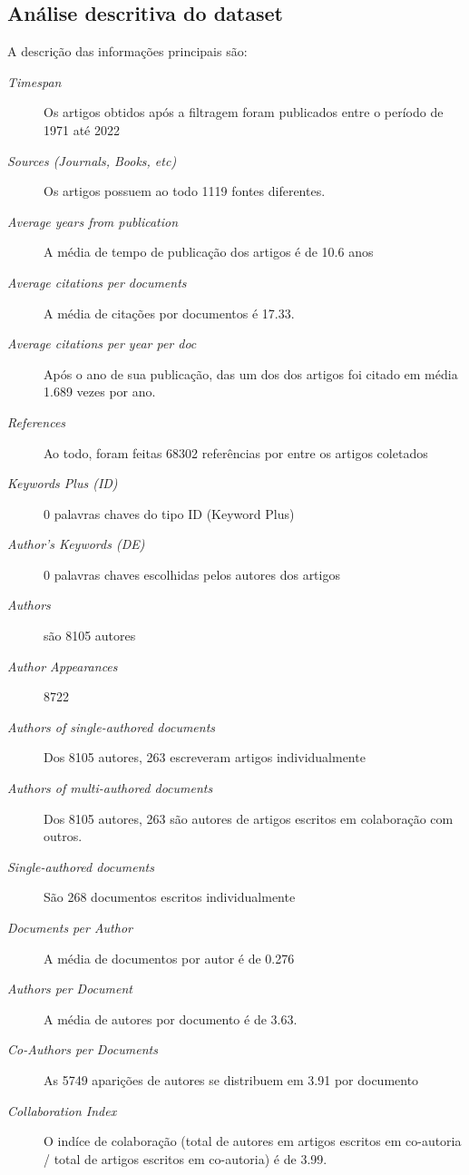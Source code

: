 \subsection{Análise descritiva do dataset}

A descrição das informações principais são:

\begin{description}
    \item [\textit{Timespan}] Os artigos obtidos após a filtragem foram publicados entre o período de 1971 até 2022
    \item [\textit{Sources (Journals, Books, etc)}] Os artigos possuem ao todo 1119 fontes diferentes.
    \item [\textit{Average years from publication}] A média de tempo de publicação dos artigos é de 10.6 anos
    \item [\textit{Average citations per documents}] A média de citações por documentos é 17.33.
    \item [\textit{Average citations per year per doc}] Após o ano de sua publicação, das um dos dos artigos foi citado em média 1.689 vezes por ano.
    \item [\textit{References}] Ao todo, foram feitas 68302 referências por entre os artigos coletados
    \item [\textit{Keywords Plus (ID)}] 0 palavras chaves do tipo ID (Keyword Plus)
    \item [\textit{Author's Keywords (DE)}]  0 palavras chaves escolhidas pelos autores dos artigos

    \item [\textit{Authors}]  são 8105 autores
    \item [\textit{Author Appearances}] 8722
    \item [\textit{Authors of single-authored documents}] Dos 8105 autores, 263 escreveram artigos individualmente
    \item [\textit{Authors of multi-authored documents}] Dos 8105 autores, 263 são autores de artigos escritos em colaboração com outros.
    \item [\textit{Single-authored documents}] São 268 documentos escritos individualmente
    \item [\textit{Documents per Author}] A média de documentos por autor é de 0.276
    \item [\textit{Authors per Document}] A média de autores por documento é de 3.63.
    \item [\textit{Co-Authors per Documents}] As 5749 aparições de autores se distribuem em 3.91 por documento
    \item [\textit{Collaboration Index}] O indíce de colaboração (total de autores em artigos escritos em co-autoria / total de artigos escritos em co-autoria) é de 3.99.
\end{description}

